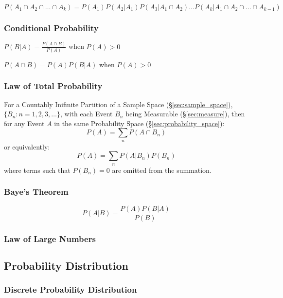 $P(A_1 \cap A_2 \cap \ldots \cap A_k) = P(A_1) P(A_2 | A_1) P(A_3 |
A_1 \cap A_2) \ldots P(A_k | A_1 \cap A_2 \cap \ldots \cap A_{k-1})$



\subsubsection{Conditional Probability}
\label{sec:conditional_probability}

$P(B|A) = \frac{P(A \cap B)}{P(A)}$ when $P(A) > 0$

$P(A \cap B) = P(A) P(B|A)$ when $P(A) > 0$



\subsubsection{Law of Total Probability}\label{sec:total_probability}

For a Countably Inifinite Partition of a Sample Space
(\S\ref{sec:sample_space}), $\{ B_n : n = 1,2,3,\ldots \}$, with each
Event $B_n$ being Measurable (\S\ref{sec:measure}), then for any Event
$A$ in the same Probability Space (\S\ref{sec:probability_space}):
\[
  P(A) = \sum_n P(A \cap B_n)
\]
or equivalently:
\[
  P(A) = \sum_n P(A|B_n) P(B_n)
\]
where terms such that $P(B_n) = 0$ are omitted from the summation.



\subsubsection{Baye's Theorem}\label{sec:bayes_theorem}

\[
  P(A|B) = \frac{P(A) P(B|A)}{P(B)}
\]


\subsubsection{Law of Large Numbers}\label{sec:law_of_large_numbers}



\subsection{Probability Distribution}
\label{sec:probability_distribution}

\subsubsection{Discrete Probability Distribution}
\label{sec:discrete_probability}

